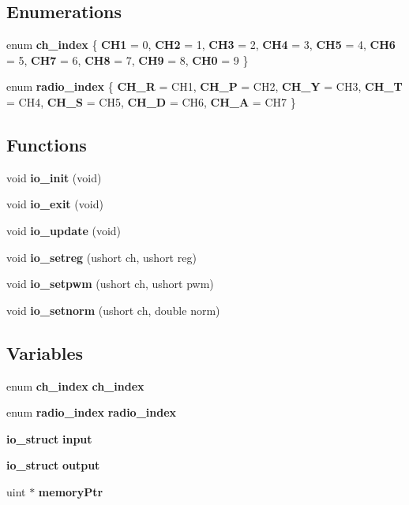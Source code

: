 \subsection*{Enumerations}
\begin{DoxyCompactItemize}
\item 
enum \textbf{ ch\+\_\+index} \{ \newline
\textbf{ C\+H1} = 0, 
\textbf{ C\+H2} = 1, 
\textbf{ C\+H3} = 2, 
\textbf{ C\+H4} = 3, 
\newline
\textbf{ C\+H5} = 4, 
\textbf{ C\+H6} = 5, 
\textbf{ C\+H7} = 6, 
\textbf{ C\+H8} = 7, 
\newline
\textbf{ C\+H9} = 8, 
\textbf{ C\+H0} = 9
 \}
\item 
enum \textbf{ radio\+\_\+index} \{ \newline
\textbf{ C\+H\+\_\+R} = C\+H1, 
\textbf{ C\+H\+\_\+P} = C\+H2, 
\textbf{ C\+H\+\_\+Y} = C\+H3, 
\textbf{ C\+H\+\_\+T} = C\+H4, 
\newline
\textbf{ C\+H\+\_\+S} = C\+H5, 
\textbf{ C\+H\+\_\+D} = C\+H6, 
\textbf{ C\+H\+\_\+A} = C\+H7
 \}
\end{DoxyCompactItemize}
\subsection*{Functions}
\begin{DoxyCompactItemize}
\item 
void \textbf{ io\+\_\+init} (void)
\item 
void \textbf{ io\+\_\+exit} (void)
\item 
void \textbf{ io\+\_\+update} (void)
\item 
void \textbf{ io\+\_\+setreg} (ushort ch, ushort reg)
\item 
void \textbf{ io\+\_\+setpwm} (ushort ch, ushort pwm)
\item 
void \textbf{ io\+\_\+setnorm} (ushort ch, double norm)
\end{DoxyCompactItemize}
\subsection*{Variables}
\begin{DoxyCompactItemize}
\item 
enum \textbf{ ch\+\_\+index} \textbf{ ch\+\_\+index}
\item 
enum \textbf{ radio\+\_\+index} \textbf{ radio\+\_\+index}
\item 
\textbf{ io\+\_\+struct} \textbf{ input}
\item 
\textbf{ io\+\_\+struct} \textbf{ output}
\item 
uint $\ast$ \textbf{ memory\+Ptr}
\end{DoxyCompactItemize}


